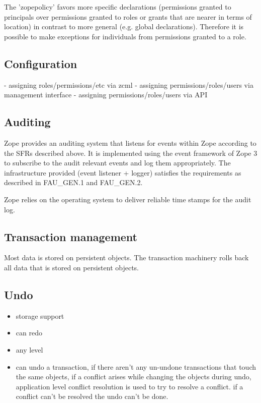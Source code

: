\documentclass[12pt,english]{scrbook}
\begin{document}
The 'zopepolicy' favors more specific declarations (permissions granted to
principals over permissions granted to roles or grants that are nearer in terms
of location) in contrast to more general (e.g. global declarations). Therefore
it is possible to make exceptions for individuals from permissions granted to a
role.




\subsection{Configuration}

- assigning roles/permissions/etc via zcml
- assigning permissions/roles/users via management interface
- assigning permissions/roles/users via API

\subsection{Auditing}

Zope provides an auditing system that listens for events within Zope according
to the SFRs described above. It is implemented using the event framework of
Zope 3 to subscribe to the audit relevant events and log them appropriately.
The infrastructure provided (event listener + logger) satisfies the
requirements as described in FAU{\_}GEN.1 and FAU{\_}GEN.2.

Zope relies on the operating system to deliver reliable time stamps for the
audit log.





\subsection{Transaction management}

Most data is stored on persistent objects. The transaction machinery rolls back
all data that is stored on persistent objects.





\subsection{Undo}
\begin{itemize}
\item {} 
storage support

\item {} 
can redo

\item {} 
any level

\item {} 
can undo a transaction, if there aren't any un-undone transactions that touch
the same objects, if a conflict arises while changing the objects during
undo, application level conflict resolution is used to try to resolve a
conflict. if a conflict can't be resolved the undo can't be done.

\end{itemize}
\end{document}
